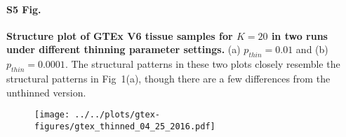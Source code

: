 \documentclass[10pt,letterpaper]{article}
\begin{document}
\paragraph{S5 Fig.}
\label{figS5}
{\bf Structure plot of GTEx V6 tissue samples for $K=20$ in two runs under different thinning parameter settings.} (a) $p_{thin}=0.01$ and (b) $p_{thin}=0.0001$. The structural patterns in these two plots closely resemble the structural patterns in Fig~1(a), though there are a few differences from the unthinned version.
\begin{figure}[ht]
\centering
\texttt{[image: ../../plots/gtex-figures/gtex\_thinned\_04\_25\_2016.pdf]}
\end{figure}
\clearpage
\end{document}
